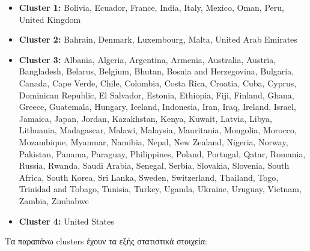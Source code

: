 \documentclass[12pt,a4paper]{article}
\begin{document}
\begin{itemize}
    \item \textbf{Cluster 1:} Bolivia, Ecuador, France, India, Italy, Mexico, Oman, Peru, United Kingdom
    \item \textbf{Cluster 2:} Bahrain, Denmark, Luxembourg, Malta, United Arab Emirates
    \item \textbf{Cluster 3:} Albania, Algeria, Argentina, Armenia, Australia, Austria, Bangladesh, Belarus, Belgium, Bhutan, Bosnia and Herzegovina, Bulgaria, Canada, Cape Verde, Chile, Colombia, Costa Rica, Croatia, Cuba, Cyprus, Dominican Republic, El Salvador, Estonia, Ethiopia, Fiji, Finland, Ghana, Greece, Guatemala, Hungary, Iceland, Indonesia, Iran, Iraq, Ireland, Israel, Jamaica, Japan, Jordan, Kazakhstan, Kenya, Kuwait, Latvia, Libya, Lithuania, Madagascar, Malawi, Malaysia, Mauritania, Mongolia, Morocco, Mozambique, Myanmar, Namibia, Nepal, New Zealand, Nigeria, Norway, Pakistan, Panama, Paraguay, Philippines, Poland, Portugal, Qatar, Romania, Russia, Rwanda, Saudi Arabia, Senegal, Serbia, Slovakia, Slovenia, South Africa, South Korea, Sri Lanka, Sweden, Switzerland, Thailand, Togo, Trinidad and Tobago, Tunisia, Turkey, Uganda, Ukraine, Uruguay, Vietnam, Zambia, Zimbabwe
    \item \textbf{Cluster 4:} United States
\end{itemize}

Τα παραπάνω clusters έχουν τα εξής στατιστικά στοιχεία:
\end{document}
